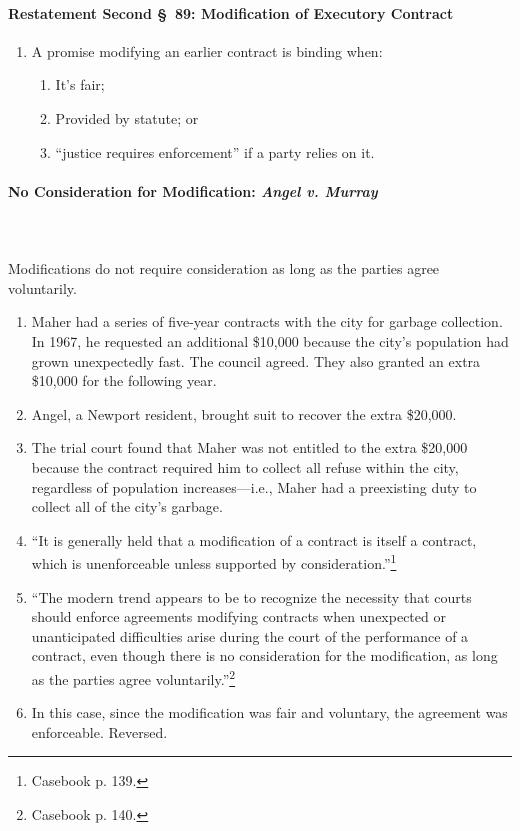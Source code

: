 \paragraph{Restatement Second \S\ 89: Modification of Executory Contract}

\begin{enumerate}
    \item A promise modifying an earlier contract is binding when:
    \begin{enumerate}
        \item It's fair;
        \item Provided by statute; or
        \item ``justice requires enforcement'' if a party relies on it.
    \end{enumerate}
\end{enumerate}

\paragraph{No Consideration for Modification: \emph{Angel v. Murray}}
~\\\\
Modifications do not require consideration as long as the parties agree 
voluntarily.

\begin{enumerate}
    \item Maher had a series of five-year contracts with the city for garbage 
    collection. In 1967, he requested an additional \$10,000 because the 
    city's population had grown unexpectedly fast. The council agreed. They 
    also granted an extra \$10,000 for the following year.
    \item Angel, a Newport resident, brought suit to recover the extra 
    \$20,000.
    \item The trial court found that Maher was not entitled to the extra 
    \$20,000 because the contract required him to collect all refuse within 
    the city, regardless of population increases---i.e., Maher had a 
    preexisting duty to collect all of the city's garbage.
    \item ``It is generally held that a modification of a contract is itself a 
    contract, which is unenforceable unless supported by 
    consideration.''\footnote{Casebook p. 139.}
    \item ``The modern trend appears to be to recognize the necessity that 
    courts should enforce agreements modifying contracts when unexpected or 
    unanticipated difficulties arise during the court of the performance of a 
    contract, even though there is no consideration for the modification, as 
    long as the parties agree voluntarily.''\footnote{Casebook p. 140.}
    \item In this case, since the modification was fair and voluntary, the 
    agreement was enforceable. Reversed.
\end{enumerate}

